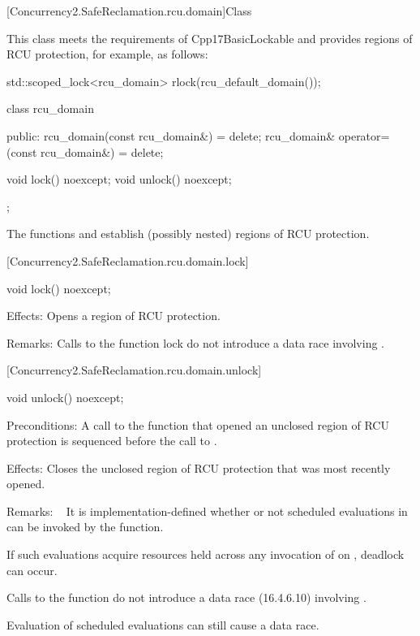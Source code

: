 [Concurrency2.SafeReclamation.rcu.domain]{Class }


This class meets the requirements of Cpp17BasicLockable  and provides regions of RCU protection, for example, as follows:

\begin{codeblock}
std::scoped_lock<rcu_domain> rlock(rcu_default_domain());
\end{codeblock}

\begin{codeblock}
class rcu_domain {
public:
  rcu_domain(const rcu_domain&) = delete;
  rcu_domain& operator=(const rcu_domain&) = delete;

  void lock() noexcept;
  void unlock() noexcept;
};
\end{codeblock}

The functions  and  establish (possibly nested)
regions of RCU protection.

[Concurrency2.SafeReclamation.rcu.domain.lock]{}

\begin{codeblock}
void lock() noexcept;
\end{codeblock}

\pnum
Effects: Opens a region of RCU protection.

\pnum
Remarks: Calls to the function lock do not introduce a data race
 involving .

[Concurrency2.SafeReclamation.rcu.domain.unlock]{}

\begin{codeblock}
void unlock() noexcept;
\end{codeblock}

\pnum
Preconditions: A call to the function  that opened
an unclosed region of RCU protection is sequenced before the
call to .

\pnum
Effects: Closes the unclosed region of RCU protection that was
most recently opened.

\pnum
Remarks:   It is implementation-defined whether or not scheduled
evaluations in  can be invoked by the 
function.
\begin{note}
If such evaluations acquire resources held across any invocation
of  on , deadlock can occur.
\end{note}
Calls to the function  do not introduce a data race
(16.4.6.10) involving .
\begin{note}
Evaluation of scheduled evaluations can still cause a data race.
\end{note}

